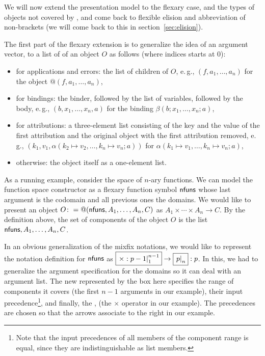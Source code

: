 We will now extend the presentation model to the flexary case, and the types of
{\openmath} objects not covered by {\isabelle}, and come back to flexible elision and
abbreviation of non-brackets (we will come back to this in section~\ref{sec:elision}).
  
The first part of the flexary extension is to generalize the idea of an argument vector,
to a list of {} of an {\openmath} object $O$ as follows (where indices
starts at $0$):
\begin{itemize}
\item for applications and errors: the list of children of $O$, e.\,g.,
  $(f,a_1,\ldots,a_n)$ for the object $@(f,a_1,\ldots,a_n)$,
\item for bindings: the binder, followed by the list of variables, followed by the body,
  e.\,g., $(b,x_1,\ldots,x_n,a)$ for the binding $\beta(b;x_1,\ldots,x_n;a)$,
\item for attributions: a three-element list consisting of the key and the value of the
  first attribution and the original object with the first attribution removed, e.\,g.,
  $(k_1,v_1,\alpha(k_2\mapsto v_2,\ldots,k_n\mapsto v_n;a))$ for $\alpha(k_1\mapsto
  v_1,\ldots,k_n\mapsto v_n;a)$,
\item otherwise: the object itself as a one-element list.
\end{itemize}
As a running example, consider the space of $n$-ary functions. We can model the function
space constructor as a flexary function symbol ${\sf{nfuns}}$ whose last argument is the
codomain and all previous ones the domains. We would like to present an {\openmath} object
$O\colon=@({\sf{nfuns}},A_1,\ldots,A_n,C)$ as $A_1\times \cdots \times A_n\to C$. By the
definition above, the set of components of the object $O$ is the list
${\sf{nfuns}},A_1,\ldots,A_n,C$.

In an obvious generalization of the mixfix notations, we would like to represent the
notation definition for $\sf{nfuns}$ as
$\fbox{\ensuremath{\left.\times:p-1\right|_{1}^{n-1}}}\to\fbox{\ensuremath{\left.p\right|_{n}}}:p$. In this, we had to
generalize the argument specification for the domains so it can deal with an argument
list. The new {} represented by the box here
specifies the range of components it covers (the first $n-1$ arguments in our example),
their input precedence\footnote{Note that the input precedences of all members of the
  component range is equal, since they are indistinguishable as list members.}, and
finally, the {}, (the $\times$ operator in our example). The
precedences are chosen so that the arrows associate to the right in our example.
  

